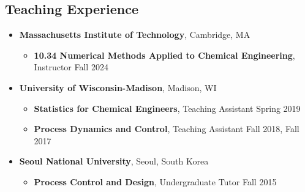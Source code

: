 \documentclass[letterpaper, 11pt]{article}
\begin{document}
\subsection*{Teaching Experience}
\begin{itemize}[leftmargin=*]
  \item[] {\bf Massachusetts Institute of Technology}, Cambridge, MA
  \begin{itemize}[leftmargin=*,itemsep=0pt]
    \item[] {\bf 10.34 Numerical Methods Applied to Chemical Engineering}, Instructor \hfill Fall 2024
  \end{itemize}
\item[] {\bf University of Wisconsin-Madison}, Madison, WI
  \begin{itemize}[leftmargin=*,itemsep=0pt]
  \item[] {\bf Statistics for Chemical Engineers}, Teaching Assistant \hfill Spring 2019
  \item[] {\bf Process Dynamics and Control}, Teaching Assistant \hfill  Fall 2018, Fall 2017
  \end{itemize}
\item[] {\bf Seoul National University}, Seoul, South Korea
  \begin{itemize}[leftmargin=*,itemsep=0pt]
  \item[] {\bf Process Control and Design}, Undergraduate Tutor \hfill  Fall 2015

\end{itemize}
\end{itemize}
\end{document}
